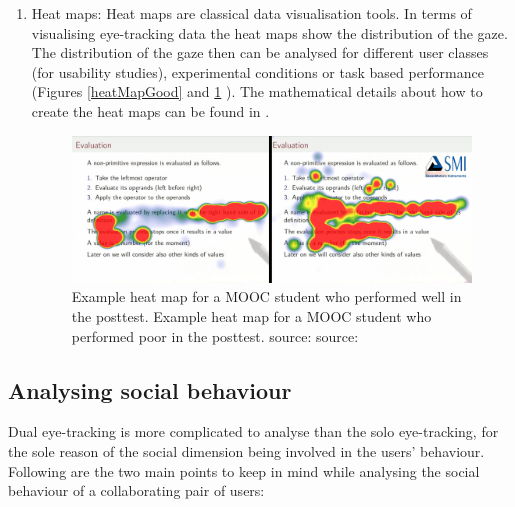 \documentclass{sig-alternate}
\begin{document}
\begin{enumerate}
\item Heat maps: Heat maps are classical data visualisation tools. In terms of visualising eye-tracking data the heat maps show the distribution of the gaze. The distribution of the gaze then can be analysed for different user classes (for usability studies), experimental conditions or task based performance (Figures \ref{heatMapGood} and \ref {heatMapBad} \cite{sharma2014how}). The mathematical details about how to create the heat maps can be found in \cite{duchowski2007eye}. 

\begin{figure}
    \centering
    \includegraphics[width=\linewidth]{heat-map}
    \caption{Example heat map for a MOOC student who performed well in the posttest.
    Example heat map for a MOOC student who performed poor in the posttest.
    source: source: \cite{sharma2014how}}
    \label{heatMapBad}
\end{figure}


\end {enumerate}


\subsection{Analysing social behaviour}

Dual eye-tracking is more complicated to analyse than the solo eye-tracking, for the sole reason of the social dimension being involved in the users' behaviour. Following are the two main points to keep in mind while analysing the social behaviour of a collaborating pair of users: 
\end{document}
